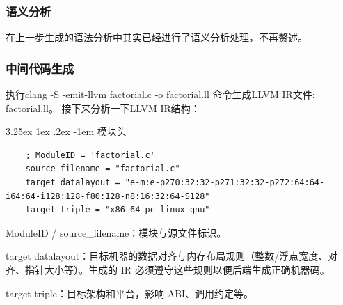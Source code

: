 \documentclass[a4paper]{article}
\makeatletter
\renewcommand\paragraph{\@startsection{paragraph}{5}{\z@}%
	{3.25ex \@plus1ex \@minus.2ex}%
	{-1em}%
	{\normalfont\normalsize\bfseries}}
\makeatother
\begin{document}
\subsubsection{语义分析}

在上一步生成的语法分析中其实已经进行了语义分析处理，不再赘述。

\subsubsection{中间代码生成}
执行clang -S -emit-llvm factorial.c -o factorial.ll 命令生成LLVM IR文件: factorial.ll。
接下来分析一下LLVM IR结构：

\paragraph{模块头}
\begin{lstlisting}
	; ModuleID = 'factorial.c'
	source_filename = "factorial.c"
	target datalayout = "e-m:e-p270:32:32-p271:32:32-p272:64:64-i64:64-i128:128-f80:128-n8:16:32:64-S128"
	target triple = "x86_64-pc-linux-gnu"
\end{lstlisting}
ModuleID / source\_filename：模块与源文件标识。

target datalayout：目标机器的数据对齐与内存布局规则（整数/浮点宽度、对齐、指针大小等）。生成的 IR 必须遵守这些规则以便后端生成正确机器码。

target triple：目标架构和平台，影响 ABI、调用约定等。
\end{document}
